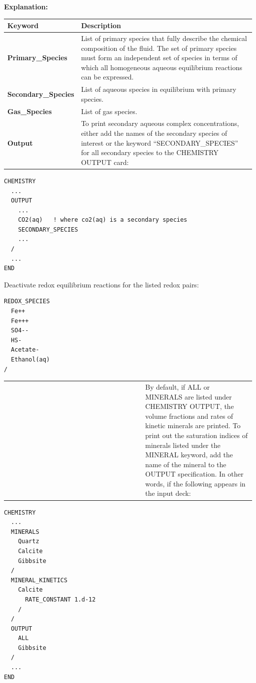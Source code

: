 \documentclass[12pt]{article}
\begin{document}
\noindent
{\bf Explanation:}

\begin{center}
\begin{tabularx}{\linewidth}{lX}
\toprule
\bf Keyword & \bf Description\\
\midrule
\bf Primary\_Species & List of primary species that fully describe the chemical composition of the fluid. The set of primary species must form an independent set of species in terms of which all homogeneous aqueous equilibrium reactions can be expressed.\\
\midrule
\bf Secondary\_Species & List of aqueous species in equilibrium with primary species.\\
\midrule
\bf Gas\_Species & List of gas species.\\
\midrule
\bf Output &
To print secondary aqueous complex concentrations, either add the names of the secondary species of interest or the keyword ``SECONDARY\_SPECIES'' for all secondary species to the CHEMISTRY OUTPUT card:
\end{tabularx}
\end{center}

\begin{verbatim}
CHEMISTRY
  ...
  OUTPUT
    ...
    CO2(aq)   ! where co2(aq) is a secondary species
    SECONDARY_SPECIES
    ...
  /
  ...
END
\end{verbatim}

Deactivate redox equilibrium reactions for the listed redox pairs:
\begin{verbatim}
REDOX_SPECIES
  Fe++
  Fe+++
  SO4--
  HS-
  Acetate-
  Ethanol(aq)
/
\end{verbatim}

\begin{center}
\begin{tabularx}{\linewidth}{lX}
~~~~~~~~~~~~~~~~~~~~~~~~~~~~~~~~~~~~~~ & By default, if ALL or MINERALS are listed under CHEMISTRY OUTPUT, the volume fractions and rates of kinetic minerals are printed.  To print out the saturation indices of minerals listed under the MINERAL keyword, add the name of the mineral to the OUTPUT specification.  In other words, if the following appears in the input deck:
\end{tabularx}
\end{center}

\begin{verbatim}
CHEMISTRY
  ...
  MINERALS
    Quartz
    Calcite
    Gibbsite
  /
  MINERAL_KINETICS
    Calcite
      RATE_CONSTANT 1.d-12
    /
  /
  OUTPUT
    ALL
    Gibbsite
  /
  ...
END
\end{verbatim}
\end{document}
